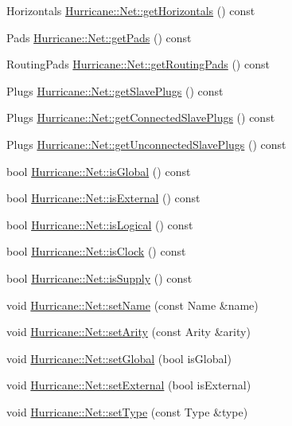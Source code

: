 \begin{DoxyCompactItemize}
\item 
Horizontals \hyperlink{group__NetClass_ga3fda4366e7a0d27b189be378b2542e00}{Hurricane\-::\-Net\-::get\-Horizontals} () const 
\item 
Pads \hyperlink{group__NetClass_ga8dda159ada778bd2b027147282fd94de}{Hurricane\-::\-Net\-::get\-Pads} () const 
\item 
Routing\-Pads \hyperlink{group__NetClass_ga294b2cd267d55a9f3ea27f974ef57145}{Hurricane\-::\-Net\-::get\-Routing\-Pads} () const 
\item 
Plugs \hyperlink{group__NetClass_ga1bf617be669b3fcf4a16ee3ceaaafdf9}{Hurricane\-::\-Net\-::get\-Slave\-Plugs} () const 
\item 
Plugs \hyperlink{group__NetClass_ga910001060974d2ed49d3de02e1ec8b18}{Hurricane\-::\-Net\-::get\-Connected\-Slave\-Plugs} () const 
\item 
Plugs \hyperlink{group__NetClass_ga8a5f01aefcae77c7f696b71e4c677048}{Hurricane\-::\-Net\-::get\-Unconnected\-Slave\-Plugs} () const 
\item 
bool \hyperlink{group__NetClass_ga2d3d69e66f8f02069ba05949c3fd14d7}{Hurricane\-::\-Net\-::is\-Global} () const 
\item 
bool \hyperlink{group__NetClass_ga50ff53a7db9ab8653dd122a6d2b90de4}{Hurricane\-::\-Net\-::is\-External} () const 
\item 
bool \hyperlink{group__NetClass_gaa131009d83d948da89b14c8045c1d894}{Hurricane\-::\-Net\-::is\-Logical} () const 
\item 
bool \hyperlink{group__NetClass_gaa01493bdfb5e48110ca45c5fc59de862}{Hurricane\-::\-Net\-::is\-Clock} () const 
\item 
bool \hyperlink{group__NetClass_ga02733d2b21037f845ce972ecb62d205a}{Hurricane\-::\-Net\-::is\-Supply} () const 
\item 
void \hyperlink{group__NetClass_ga20a6fd0118d74e03de75197c06dc674e}{Hurricane\-::\-Net\-::set\-Name} (const Name \&name)
\item 
void \hyperlink{group__NetClass_gaf5dfdca4401902ee7e1e46a1a486da38}{Hurricane\-::\-Net\-::set\-Arity} (const Arity \&arity)
\item 
void \hyperlink{group__NetClass_ga35c84afd9dade0cb715602bcf8ec8865}{Hurricane\-::\-Net\-::set\-Global} (bool is\-Global)
\item 
void \hyperlink{group__NetClass_ga6a30bc8282ce7e4b936e73a11549fedf}{Hurricane\-::\-Net\-::set\-External} (bool is\-External)
\item 
void \hyperlink{group__NetClass_ga83f5ce12291b0ec5ab584d515dd8963c}{Hurricane\-::\-Net\-::set\-Type} (const Type \&type)

\end{DoxyCompactItemize}
